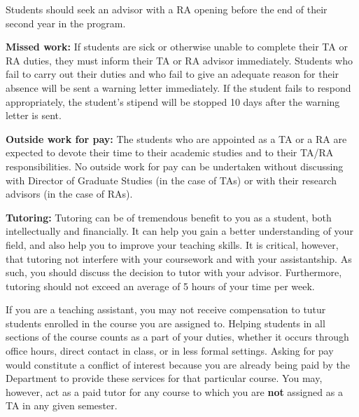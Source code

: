Students should seek an advisor with a RA opening before the end of
their second year in the program.

\textbf{Missed work:} If students are sick or otherwise unable to
complete their TA or RA duties, they must inform their TA or RA
advisor immediately. Students who fail to carry out their duties and
who fail to give an adequate reason for their absence will be sent a
warning letter immediately. If the student fails to respond
appropriately, the student’s stipend will be stopped 10 days after the
warning letter is sent.

\textbf{Outside work for pay:} The students who are appointed as a TA
or a RA are expected to devote their time to their academic studies
and to their TA/RA responsibilities. No outside work for pay can be
undertaken without discussing with Director of Graduate Studies (in
the case of TAs) or with their research advisors (in the case of RAs).

\textbf{Tutoring:} Tutoring can be of tremendous benefit to you as a
student, both intellectually and financially.  It can help you gain a
better understanding of your field, and also help you to improve your
teaching skills.  It is critical, however, that tutoring not interfere
with your coursework and with your assistantship.  As such, you should
discuss the decision to tutor with your advisor.  Furthermore,
tutoring should not exceed an average of 5 hours of your time per
week.

If you are a teaching assistant, you may not receive compensation to
tutur students enrolled in the course you are assigned to.  Helping
students in all sections of the course counts as a part of your
duties, whether it occurs through office hours, direct contact in
class, or in less formal settings.  Asking for pay would constitute a
conflict of interest because you are already being paid by the
Department to provide these services for that particular course.  You
may, however, act as a paid tutor for any course to which you are
\textbf{not} assigned as a TA in any given semester.
